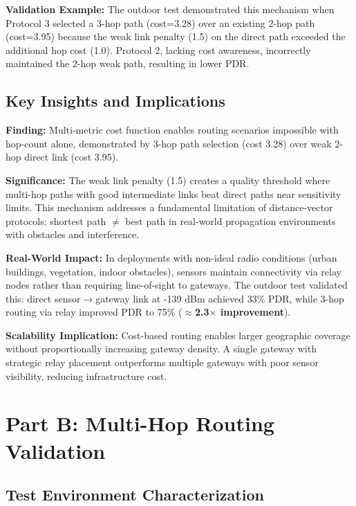 \textbf{Validation Example:} The outdoor test demonstrated this mechanism when Protocol 3 selected a 3-hop path (cost=3.28) over an existing 2-hop path (cost=3.95) because the weak link penalty (1.5) on the direct path exceeded the additional hop cost (1.0). Protocol 2, lacking cost awareness, incorrectly maintained the 2-hop weak path, resulting in lower PDR.

\subsection{Key Insights and Implications}

\textbf{Finding:} Multi-metric cost function enables routing scenarios impossible with hop-count alone, demonstrated by 3-hop path selection (cost 3.28) over weak 2-hop direct link (cost 3.95).

\textbf{Significance:} The weak link penalty (1.5) creates a quality threshold where multi-hop paths with good intermediate links beat direct paths near sensitivity limits. This mechanism addresses a fundamental limitation of distance-vector protocols: shortest path $\neq$ best path in real-world propagation environments with obstacles and interference.

\textbf{Real-World Impact:} In deployments with non-ideal radio conditions (urban buildings, vegetation, indoor obstacles), sensors maintain connectivity via relay nodes rather than requiring line-of-sight to gateways. The outdoor test validated this: direct sensor$\rightarrow$gateway link at -139 dBm achieved 33\% PDR, while 3-hop routing via relay improved PDR to 75\% (\textbf{$\approx$2.3$\times$ improvement}).

\textbf{Scalability Implication:} Cost-based routing enables larger geographic coverage without proportionally increasing gateway density. A single gateway with strategic relay placement outperforms multiple gateways with poor sensor visibility, reducing infrastructure cost.

\section{Part B: Multi-Hop Routing Validation}
\label{sec:multihop-validation}

\subsection{Test Environment Characterization}
\label{sec:test-environment}

